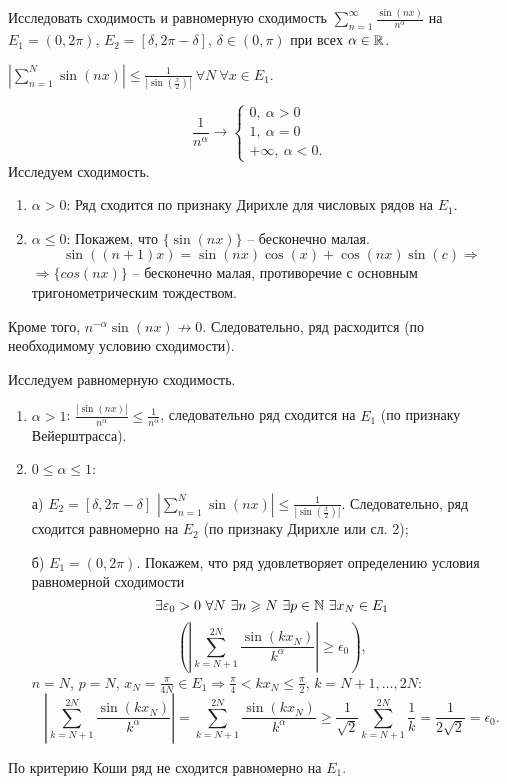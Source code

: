 \begin{example}
    Исследовать сходимость и равномерную сходимость $\sum_{n = 1}^{\infty} \frac{\sin(nx)}{n^{\alpha}}$ на $E_{1} = (0, 2\pi)$, $E_{2} = [\delta, 2\pi - \delta]$, $\delta \in (0, \pi)$ при всех $\alpha \in \mathbb{R}$.
\end{example}

\begin{solution}
    $\left|\sum_{n = 1}^{N} \sin(nx)\right| \leq \frac{1}{|\sin(\frac{x}{2})|} \ \forall N \ \forall x \in E_{1}$.

    \[\frac{1}{n^{\alpha}} \to \begin{cases}
        0, \ \alpha > 0 \\
        1, \ \alpha = 0 \\
        +\infty, \ \alpha < 0.
    \end{cases}\]
    Исследуем сходимость. 
    \begin{enumerate}
        \item $\alpha > 0$: Ряд сходится по признаку Дирихле для числовых рядов на $E_{1}$.
        \item $\alpha \leq 0$: Покажем, что $\{\sin(nx)\}$ -- бесконечно малая.
        \[\sin((n + 1)x) = \sin(nx)\cos(x) + \cos(nx)\sin(c) \Rightarrow\]
        $\Rightarrow \{cos(nx)\}$ -- бесконечно малая, противоречие с основным тригонометрическим тождеством.
    \end{enumerate}
    Кроме того, $n^{-\alpha}\sin(nx) \not\to 0$. Следовательно, ряд расходится (по необходимому условию сходимости).

    Исследуем равномерную сходимость.
    \begin{enumerate}
        \item $\alpha > 1$: $\frac{|\sin(nx)|}{n^{\alpha}} \leq \frac{1}{n^{\alpha}}$, следовательно ряд сходится на $E_{1}$ (по признаку Вейерштрасса).
        \item $0 \leq \alpha \leq 1$:
        
        а) $E_{2} = [\delta, 2\pi - \delta]$ $\left|\sum_{n = 1}^{N}\sin(nx)\right| \leq \frac{1}{|\sin(\frac{x}{2})|}$. Следовательно, ряд сходится равномерно на $E_{2}$ (по признаку Дирихле или сл. 2);

        б) $E_{1} = (0, 2\pi)$. Покажем, что ряд удовлетворяет определению условия равномерной сходимости
        \[\exists \epsilon_{0} > 0 \ \forall N \ \exists n \geq N \ \exists p \in \N \ \exists x_{N} \in E_{1} \]
        \[\left(\left|\sum_{k = N + 1}^{2N} \frac{\sin(kx_{N})}{k^{\alpha}}\right| \geq \epsilon_{0}\right),\]
        $n = N$, $p = N$, $x_{N} = \frac{\pi}{4N} \in E_{1} \Rightarrow \frac{\pi}{4} < kx_{N} \leq \frac{\pi}{2}$, $k = N+1, \ldots, 2N:$
        \[\left|\sum_{k = N + 1}^{2N} \frac{\sin(kx_{N})}{k^{\alpha}}\right| = \sum_{k = N + 1}^{2N} \frac{\sin(kx_{N})}{k^{\alpha}} \geq \frac{1}{\sqrt{2}}\sum_{k = N+1}^{2N}\frac{1}{k} = \frac{1}{2\sqrt{2}} = \epsilon_{0}.\]
    \end{enumerate}
    По критерию Коши ряд не сходится равномерно на $E_{1}$.
\end{solution}